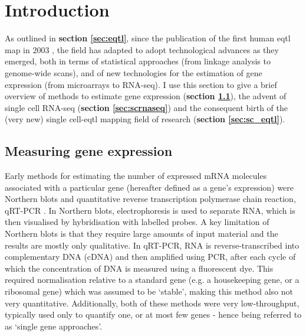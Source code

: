 
\newpage

\section{Introduction}

As outlined in \textbf{section \ref{sec:eqtl}}, since the publication of the first human \gls{eqtl} map in 2003 \cite{schadt2003genetics}, the field has adapted to adopt technological advances as they emerged, both in terms of statistical approaches (from linkage analysis to genome-wide scans), and of new technologies for the estimation of gene expression (from microarrays to RNA-seq).
I use this section to give a brief overview of methods to estimate gene expression (\textbf{section \ref{sec:gene_expression}}), the advent of single cell RNA-seq (\textbf{section \ref{sec:scrnaseq}}) and the consequent birth of the (very new) single cell-\gls{eqtl} mapping field of research (\textbf{section \ref{sec:sc_eqtl}}). 

\subsection{Measuring gene expression}
\label{sec:gene_expression}

Early methods for estimating the number of expressed mRNA molecules associated with a particular gene (hereafter defined as a gene's expression) were Northern blots \cite{alwine1977method} and quantitative reverse transcription polymerase chain reaction, qRT-PCR \cite{gibson1996novel}. 
In Northern blots, electrophoresis is used to separate RNA, which is then visualised by hybridisation with labelled probes. 
A key limitation of Northern blots is that they require large amounts of input material and the results are mostly only qualitative.
In qRT-PCR, RNA is reverse-transcribed into complementary DNA (cDNA) and then amplified using PCR, after each cycle of which the concentration of DNA is measured using a fluorescent dye. 
This required normalisation relative to a standard gene (e.g. a housekeeping gene, or a ribosomal gene) which was assumed to be `stable', making this method also not very quantitative.
Additionally, both of these methods were very low-throughput, typically used only to quantify one, or at most few genes - hence being referred to as `single gene approaches'.
\\

